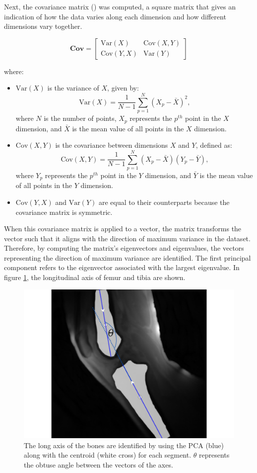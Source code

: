 \documentclass{micro-econ-thesis}
\begin{document}
Next, the covariance matrix () was computed, a square matrix that gives an indication of how the data varies along each dimension and how different dimensions vary together. 

\begin{equation}
	\mathbf{Cov} = 
	\begin{bmatrix}
		\mathrm{Var}(X) & \mathrm{Cov}(X,Y) \\
		\mathrm{Cov}(Y,X) & \mathrm{Var}(Y)
	\end{bmatrix}
	\label{eq:cov}
\end{equation}

where:
\begin{itemize}
	\item \(\mathrm{Var}(X)\) is the variance of \(X\), given by:
	\[
	\mathrm{Var}(X) = \frac{1}{N-1} \sum_{p=1}^{N} (X_{p} - \bar{X})^2,
	\]
	where \(N\) is the number of points, \(X_{p}\) represents the \(p^{th}\) point in the \(X\) dimension, and \(\bar{X}\) is the mean value of all points in the \(X\) dimension. 
	\item \(\mathrm{Cov}(X,Y)\) is the covariance between dimensions \(X\) and \(Y\), defined as:
	\[
	\mathrm{Cov}(X,Y) = \frac{1}{N-1} \sum_{p=1}^{N} (X_{p} - \bar{X})(Y_{p} - \bar{Y}),
	\]
	where \(Y_{p}\) represents the \(p^{th}\) point in the \(Y\) dimension, and \(\bar{Y}\) is the mean value of all points in the \(Y\) dimension.
	
	\item \(\mathrm{Cov}(Y,X)\) and  \(\mathrm{Var}(Y)\) are equal to their counterparts because the covariance matrix is symmetric. 

\end{itemize}


When this covariance matrix is applied to a vector, the matrix transforms the vector such that it aligns with the direction of maximum variance in the dataset. Therefore, by computing the matrix's eigenvectors and eigenvalues, the vectors representing the direction of maximum variance are identified. The first principal component refers to the eigenvector associated with the largest eigenvalue. In figure \ref{fig:longaxes}, the longitudinal axis of femur and tibia are shown. 

\begin{figure}[H]
	\centering
	\includegraphics[width=0.7\linewidth]{theta_angle_new}
	\caption{The long axis of the bones are identified by using the PCA (blue) along with the centroid (white cross) for each segment. $\theta$ represents the obtuse angle between the vectors of the axes.}
	\label{fig:longaxes}
\end{figure}
\end{document}
